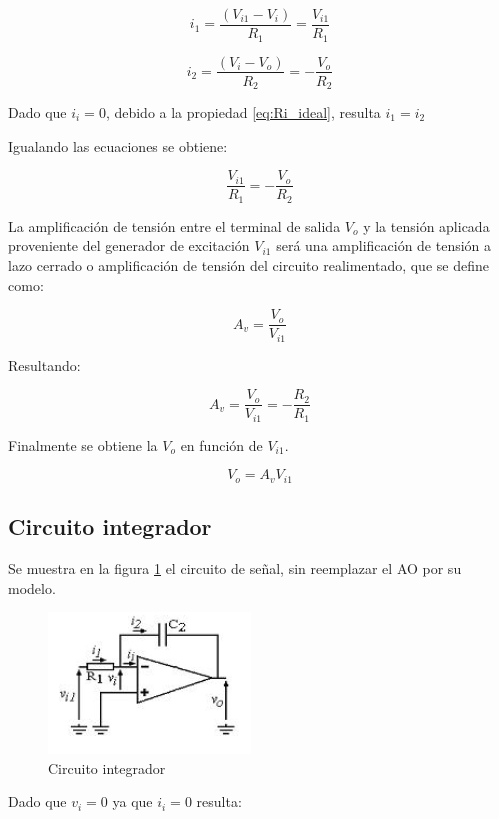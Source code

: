 \documentclass[10pt,spanish,a4paper,openany,notitlepage]{article}
\begin{document}
\[ \displaystyle i_1 = \frac{(V_{i1} - V_i)}{R_1} = \frac{V_{i1}}{R_1} \]

\[ \displaystyle i_2 = \frac{(V_i - V_o)}{R_2} = -\frac{V_o}{R_2} \]

Dado que $i_i = 0$, debido a la propiedad \ref{eq:Ri_ideal}, resulta $i_1 = i_2$

Igualando las ecuaciones se obtiene:

\[ \displaystyle \frac{V_{i1}}{R_1} = -\frac{V_o}{R_2} \]

La amplificación de tensión entre el terminal de salida $V_o$ y la tensión aplicada proveniente del
generador de excitación $V_{i1}$ será una amplificación de tensión a lazo cerrado o amplificación de
tensión del circuito realimentado, que se define como:

\[ \displaystyle A_v = \frac{V_o}{V_{i1}} \]

Resultando:

\begin{equation}
    A_v = \frac{V_o}{V_{i1}} = -\frac{R_2}{R_1}
\label{eq:gan_amplificador}
\end{equation}

Finalmente se obtiene la $V_o$ en función de $V_{i1}$.

\begin{equation}
    V_o = A_v V_{i1}
    \label{eq:amplificador}
\end{equation}


\subsection{Circuito integrador}

Se muestra en la figura \ref{fig:intro_integrador} el circuito de señal, sin reemplazar el AO por su modelo.


\begin{figure}[H]
\centering
\includegraphics[scale=1]{circuitos/integrador.png}
\caption{Circuito integrador}
\label{fig:intro_integrador}
\end{figure}

Dado que $v_i = 0$ ya que $i_i = 0$ resulta:
\end{document}
